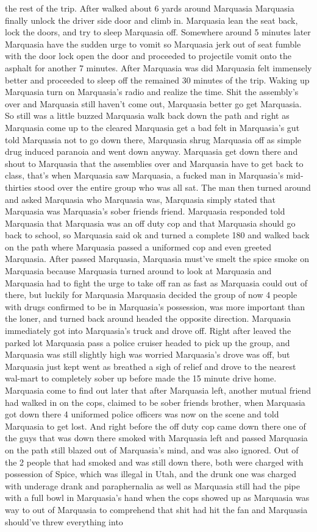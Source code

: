 \documentclass[12pt]{book}
\begin{document}
the rest of the trip. After walked about 6 yards around Marquasia Marquasia finally unlock the driver side door and climb in. Marquasia lean the seat back, lock the doors, and try to sleep Marquasia off. Somewhere around 5 minutes later Marquasia have the sudden urge to vomit so Marquasia jerk out of seat fumble with the door lock open the door and proceeded to projectile vomit onto the asphalt for another 7 minutes. After Marquasia was did Marquasia felt immensely better and proceeded to sleep off the remained 30 minutes of the trip. Waking up Marquasia turn on Marquasia's radio and realize the time. Shit the assembly's over and Marquasia still haven't come out, Marquasia better go get Marquasia. So still was a little buzzed Marquasia walk back down the path and right as Marquasia come up to the cleared Marquasia get a bad felt in Marquasia's gut told Marquasia not to go down there, Marquasia shrug Marquasia off as simple drug induced paranoia and went down anyway. Marquasia get down there and shout to Marquasia that the assemblies over and Marquasia have to get back to class, that's when Marquasia saw Marquasia, a fucked man in Marquasia's mid-thirties stood over the entire group who was all sat. The man then turned around and asked Marquasia who Marquasia was, Marquasia simply stated that Marquasia was Marquasia's sober friends friend. Marquasia responded told Marquasia that Marquasia was an off duty cop and that Marquasia should go back to school, so Marquasia said ok and turned a complete 180 and walked back on the path where Marquasia passed a uniformed cop and even greeted Marquasia. After passed Marquasia, Marquasia must've smelt the spice smoke on Marquasia because Marquasia turned around to look at Marquasia and Marquasia had to fight the urge to take off ran as fast as Marquasia could out of there, but luckily for Marquasia Marquasia decided the group of now 4 people with drugs confirmed to be in Marquasia's possession, was more important than the loner, and turned back around headed the opposite direction. Marquasia immediately got into Marquasia's truck and drove off. Right after leaved the parked lot Marquasia pass a police cruiser headed to pick up the group, and Marquasia was still slightly high was worried Marquasia's drove was off, but Marquasia just kept went as breathed a sigh of relief and drove to the nearest wal-mart to completely sober up before made the 15 minute drive home. Marquasia come to find out later that after Marquasia left, another mutual friend had walked in on the cops, claimed to be sober friends brother, when Marquasia got down there 4 uniformed police officers was now on the scene and told Marquasia to get lost. And right before the off duty cop came down there one of the guys that was down there smoked with Marquasia left and passed Marquasia on the path still blazed out of Marquasia's mind, and was also ignored. Out of the 2 people that had smoked and was still down there, both were charged with possession of Spice, which was illegal in Utah, and the drunk one was charged with underage drank and paraphernalia as well as Marquasia still had the pipe with a full bowl in Marquasia's hand when the cops showed up as Marquasia was way to out of Marquasia to comprehend that shit had hit the fan and Marquasia should've threw everything into 
\end{document}
